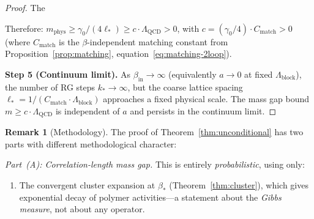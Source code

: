 \documentclass[11pt]{article}
\theoremstyle{definition}
\newtheorem{remark}[theorem]{Remark}
\newcommand{\Lam}{\Lambda_{\mathrm{QCD}}}
\begin{document}
\begin{proof}
The

Therefore:
$m_{\mathrm{phys}}
\ge\gamma_0/(4\ell_*)
\ge c\cdot\Lam>0$,
with $c=(\gamma_0/4)\cdot C_{\mathrm{match}}>0$
(where $C_{\mathrm{match}}$ is the $\beta$-independent
matching constant from Proposition~\ref{prop:matching},
equation~\eqref{eq:matching-2loop}).

\medskip\noindent\textbf{Step 5 (Continuum limit).}
As $\beta_{\mathrm{in}}\to\infty$ (equivalently $a\to 0$ at fixed
$\Lambda_{\mathrm{block}}$), the number of RG steps $k_*\to\infty$, but the coarse
lattice spacing $\ell_*=1/(C_{\mathrm{match}}\cdot\Lambda_{\mathrm{block}})$ approaches a
fixed physical scale.  The mass gap bound
$m\ge c\cdot\Lam$ is independent of $a$ and persists in the
continuum limit.
\end{proof}

\begin{remark}[Methodology]\label{rem:method}
The proof of Theorem~\ref{thm:unconditional} has two parts with
different methodological character:

\emph{Part~(A): Correlation-length mass gap.}
This is entirely \emph{probabilistic}, using only:
\begin{enumerate}[nosep]
\item The convergent cluster expansion at $\beta_*$
(Theorem~\ref{thm:cluster}), which gives exponential decay
of polymer activities---a statement about the \emph{Gibbs
measure}, not about any operator.


\end{enumerate}
\end{remark}
\end{document}
